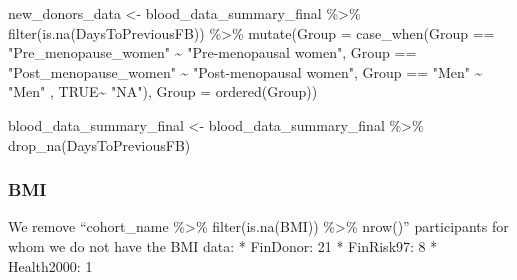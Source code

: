 \documentclass[
]{article}
\newenvironment{Shaded}{\begin{snugshade}}{\end{snugshade}}
\newcommand{\AttributeTok}[1]{\textcolor[rgb]{0.77,0.63,0.00}{#1}}
\newcommand{\ConstantTok}[1]{\textcolor[rgb]{0.00,0.00,0.00}{#1}}
\newcommand{\FunctionTok}[1]{\textcolor[rgb]{0.00,0.00,0.00}{#1}}
\newcommand{\NormalTok}[1]{#1}
\newcommand{\OtherTok}[1]{\textcolor[rgb]{0.56,0.35,0.01}{#1}}
\newcommand{\SpecialCharTok}[1]{\textcolor[rgb]{0.00,0.00,0.00}{#1}}
\newcommand{\StringTok}[1]{\textcolor[rgb]{0.31,0.60,0.02}{#1}}
\begin{document}
\begin{Shaded}
\begin{Highlighting}[]
\NormalTok{new\_donors\_data }\OtherTok{\textless{}{-}}\NormalTok{ blood\_data\_summary\_final }\SpecialCharTok{\%\textgreater{}\%} 
  \FunctionTok{filter}\NormalTok{(}\FunctionTok{is.na}\NormalTok{(DaysToPreviousFB)) }\SpecialCharTok{\%\textgreater{}\%} 
    \FunctionTok{mutate}\NormalTok{(}\AttributeTok{Group =} \FunctionTok{case\_when}\NormalTok{(Group }\SpecialCharTok{==} \StringTok{"Pre\_menopause\_women"} \SpecialCharTok{\textasciitilde{}} \StringTok{"Pre{-}menopausal women"}\NormalTok{,}
\NormalTok{                   Group }\SpecialCharTok{==} \StringTok{"Post\_menopause\_women"} \SpecialCharTok{\textasciitilde{}} \StringTok{"Post{-}menopausal women"}\NormalTok{,}
\NormalTok{                   Group }\SpecialCharTok{==} \StringTok{"Men"} \SpecialCharTok{\textasciitilde{}} \StringTok{"Men"}\NormalTok{ ,}
                   \ConstantTok{TRUE}\SpecialCharTok{\textasciitilde{}} \StringTok{"NA"}\NormalTok{),}
         \AttributeTok{Group =} \FunctionTok{ordered}\NormalTok{(Group)) }

\NormalTok{blood\_data\_summary\_final }\OtherTok{\textless{}{-}}\NormalTok{ blood\_data\_summary\_final }\SpecialCharTok{\%\textgreater{}\%} 
  \FunctionTok{drop\_na}\NormalTok{(DaysToPreviousFB)}
\end{Highlighting}
\end{Shaded}

\hypertarget{bmi}{%
\subsubsection{BMI}\label{bmi}}

We remove ``cohort\_name \%\textgreater\% filter(is.na(BMI))
\%\textgreater\% nrow()'' participants for whom we do not have the BMI
data: * FinDonor: 21 * FinRisk97: 8 * Health2000: 1
\end{document}
